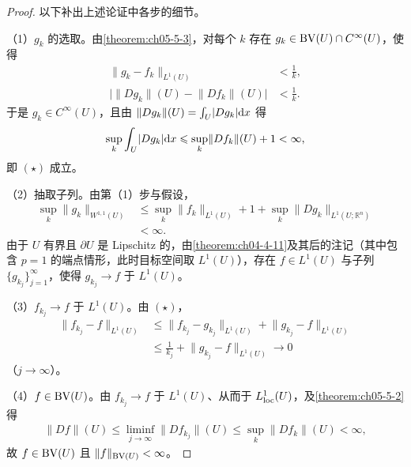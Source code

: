 \documentclass[../../main.tex]{subfiles}%
\begin{document}
\begin{proof}
以下补出上述论证中各步的细节。

（1）$g_k$ 的选取。由\cref{theorem:ch05-5-3}，对每个 $k$ 存在 $g_k\in\mathrm{BV}(U)\cap C^{\infty}(U)$，使得%
\begin{align*}
\lVert g_k-f_k\rVert_{L^1(U)}&<\frac{1}{k},\\
\bigl\lvert\lVert Dg_k\rVert(U)-\lVert Df_k\rVert(U)\bigr\rvert&<\frac{1}{k}.
\end{align*}
于是 $g_k\in C^{\infty}(U)$，且由 $\lVert Dg_k\rVert(U)=\int_U\lvert Dg_k\rvert\mathrm{d} x$ 得
\begin{align*}
\sup_{k}\int_U\lvert Dg_k\rvert\mathrm{d} x\leqslant\sup_{k}\lVert Df_k\rVert(U)+1<\infty,
\end{align*}
即 $(\star)$ 成立。

（2）抽取子列。由第（1）步与假设，
\begin{align*}
\sup_{k}\lVert g_k\rVert_{W^{1,1}(U)}&\leqslant\sup_{k}\lVert f_k\rVert_{L^1(U)}+1+\sup_{k}\lVert Dg_k\rVert_{L^1(U;\mathbb{R}^n)}\\
&<\infty .
\end{align*}
由于 $U$ 有界且 $\partial U$ 是 Lipschitz 的，由\cref{theorem:ch04-4-11}及其后的注记（其中包含 $p=1$ 的端点情形，此时目标空间取 $L^1(U)$），存在 $f\in L^1(U)$ 与子列 $\{g_{k_j}\}_{j=1}^{\infty}$，使得 $g_{k_j}\to f$ 于 $L^1(U)$。%

（3）$f_{k_j}\to f$ 于 $L^1(U)$。由 $(\star)$，
\begin{align*}
\lVert f_{k_j}-f\rVert_{L^1(U)}&\leqslant\lVert f_{k_j}-g_{k_j}\rVert_{L^1(U)}+\lVert g_{k_j}-f\rVert_{L^1(U)}\\
&\leqslant\frac{1}{k_j}+\lVert g_{k_j}-f\rVert_{L^1(U)}\longrightarrow0
\end{align*}
（$j\to\infty$）。

（4）$f\in\mathrm{BV}(U)$。由 $f_{k_j}\to f$ 于 $L^1(U)$、从而于 $L^1_{\mathrm{loc}}(U)$，及\cref{theorem:ch05-5-2}得%
\begin{align*}
\lVert Df\rVert(U)\leqslant\liminf_{j\to\infty}\lVert Df_{k_j}\rVert(U)\leqslant\sup_{k}\lVert Df_k\rVert(U)<\infty,
\end{align*}
故 $f\in\mathrm{BV}(U)$ 且 $\lVert f\rVert_{\mathrm{BV}(U)}<\infty$。
\end{proof}
\end{document}
